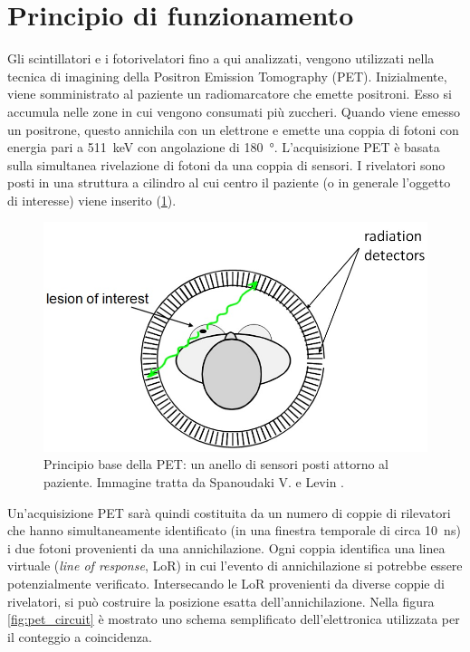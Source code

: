 \section{Principio di funzionamento}
Gli scintillatori e i fotorivelatori fino a qui analizzati, vengono utilizzati nella tecnica di imagining della Positron Emission Tomography (PET). Inizialmente, viene somministrato al paziente un radiomarcatore che emette positroni. Esso si accumula nelle zone in cui vengono consumati più zuccheri. Quando viene emesso un positrone, questo annichila con un elettrone e emette una coppia di fotoni con energia pari a \SI{511}{\kilo\electronvolt} con angolazione di \SI{180}{\degree}. L'acquisizione PET è basata sulla simultanea rivelazione di fotoni da una coppia di sensori. I rivelatori sono posti in una struttura a cilindro al cui centro il paziente (o in generale l'oggetto di interesse) viene inserito (\Fig\ref{fig:pet}).
\begin{figure}[b!]
	\centering
	\includegraphics[width=0.7\linewidth]{./ImageFiles/PET.jpg}
	\caption{Principio base della PET: un anello di sensori posti attorno al paziente. Immagine tratta da Spanoudaki V. e Levin \cite{Spanoudaki2010}.}
	\label{fig:pet}
\end{figure} 
Un'acquisizione PET sarà quindi costituita da un numero di coppie di rilevatori che hanno simultaneamente identificato (in una finestra temporale di circa \SI{10}{\nano\second}) i due fotoni provenienti da una annichilazione. Ogni coppia identifica una linea virtuale (\textit{line of response}, LoR) in cui l'evento di annichilazione si potrebbe essere potenzialmente verificato. Intersecando le LoR provenienti da diverse coppie di rivelatori, si può costruire la posizione esatta dell'annichilazione. Nella figura \ref{fig:pet_circuit} è mostrato uno schema semplificato dell'elettronica utilizzata per il conteggio a coincidenza.
